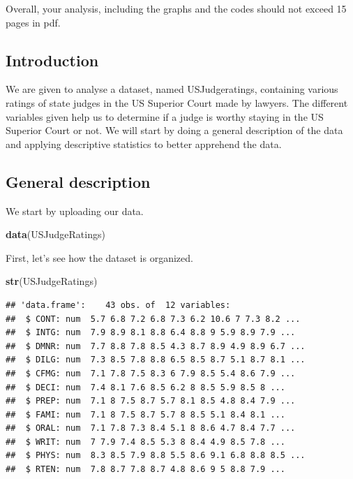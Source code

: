 \documentclass[]{article}
\newenvironment{Shaded}{\begin{snugshade}}{\end{snugshade}}
\newcommand{\KeywordTok}[1]{\textcolor[rgb]{0.13,0.29,0.53}{\textbf{#1}}}
\newcommand{\NormalTok}[1]{#1}
\begin{document}
Overall, your analysis, including the graphs and the codes should not
exceed 15 pages in pdf.

\hypertarget{introduction}{%
\subsection{Introduction}\label{introduction}}

We are given to analyse a dataset, named USJudgeratings, containing
various ratings of state judges in the US Superior Court made by
lawyers. The different variables given help us to determine if a judge
is worthy staying in the US Superior Court or not. We will start by
doing a general description of the data and applying descriptive
statistics to better apprehend the data.

\hypertarget{general-description}{%
\subsection{General description}\label{general-description}}

We start by uploading our data.

\begin{Shaded}
\begin{Highlighting}[]
\KeywordTok{data}\NormalTok{(USJudgeRatings)}
\end{Highlighting}
\end{Shaded}

First, let's see how the dataset is organized.

\begin{Shaded}
\begin{Highlighting}[]
\KeywordTok{str}\NormalTok{(USJudgeRatings)}
\end{Highlighting}
\end{Shaded}

\begin{verbatim}
## 'data.frame':    43 obs. of  12 variables:
##  $ CONT: num  5.7 6.8 7.2 6.8 7.3 6.2 10.6 7 7.3 8.2 ...
##  $ INTG: num  7.9 8.9 8.1 8.8 6.4 8.8 9 5.9 8.9 7.9 ...
##  $ DMNR: num  7.7 8.8 7.8 8.5 4.3 8.7 8.9 4.9 8.9 6.7 ...
##  $ DILG: num  7.3 8.5 7.8 8.8 6.5 8.5 8.7 5.1 8.7 8.1 ...
##  $ CFMG: num  7.1 7.8 7.5 8.3 6 7.9 8.5 5.4 8.6 7.9 ...
##  $ DECI: num  7.4 8.1 7.6 8.5 6.2 8 8.5 5.9 8.5 8 ...
##  $ PREP: num  7.1 8 7.5 8.7 5.7 8.1 8.5 4.8 8.4 7.9 ...
##  $ FAMI: num  7.1 8 7.5 8.7 5.7 8 8.5 5.1 8.4 8.1 ...
##  $ ORAL: num  7.1 7.8 7.3 8.4 5.1 8 8.6 4.7 8.4 7.7 ...
##  $ WRIT: num  7 7.9 7.4 8.5 5.3 8 8.4 4.9 8.5 7.8 ...
##  $ PHYS: num  8.3 8.5 7.9 8.8 5.5 8.6 9.1 6.8 8.8 8.5 ...
##  $ RTEN: num  7.8 8.7 7.8 8.7 4.8 8.6 9 5 8.8 7.9 ...
\end{verbatim}
\end{document}
